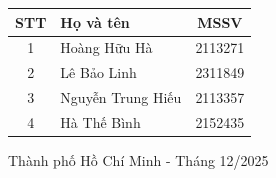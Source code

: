 \documentclass[12pt,a4paper]{article}
\begin{document}
\begin{titlepage}
    \vspace{0.3cm}
    \begin{center}
        \begin{tabular}{|c|l|c|}
        \hline
        \textbf{STT} & \textbf{Họ và tên} & \textbf{MSSV} \\
        \hline
        1 & Hoàng Hữu Hà & 2113271 \\
        \hline
        2 & Lê Bảo Linh & 2311849 \\
        \hline
        3 & Nguyễn Trung Hiếu & 2113357 \\
        \hline
        4 & Hà Thế Bình & 2152435 \\
        \hline
        \end{tabular}
    \end{center}

    \vfill
    \begin{center}
        {\normalsize Thành phố Hồ Chí Minh - Tháng 12/2025}
    \end{center}
\end{titlepage}
\newpage

\tableofcontents
\newpage

\listoffigures
\newpage

\listoftables
\newpage




\newpage


\newpage


\newpage


\newpage


\newpage


\newpage



\end{document}
